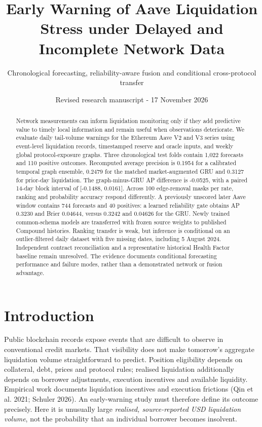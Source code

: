 \documentclass[
  10pt,
  a4paper,
]{article}
\title{Early Warning of Aave Liquidation Stress under Delayed and
Incomplete Network Data}
\subtitle{Chronological forecasting, reliability-aware fusion and
conditional cross-protocol transfer}
\author{}
\date{Revised research manuscript - 17 November 2026}
\begin{document}
\maketitle
\begin{abstract}
Network measurements can inform liquidation monitoring only if they add
predictive value to timely local information and remain useful when
observations deteriorate. We evaluate daily tail-volume warnings for the
Ethereum Aave V2 and V3 series using event-level liquidation records,
timestamped reserve and oracle inputs, and weekly global
protocol-exposure graphs. Three chronological test folds contain 1,022
forecasts and 110 positive outcomes. Recomputed average precision is
0.1954 for a calibrated temporal graph ensemble, 0.2479 for the matched
market-augmented GRU and 0.3127 for prior-day liquidation. The
graph-minus-GRU AP difference is -0.0525, with a paired 14-day block
interval of {[}-0.1488, 0.0161{]}. Across 100 edge-removal masks per
rate, ranking and probability accuracy respond differently. A previously
unscored later Aave window contains 744 forecasts and 40 positives: a
learned reliability gate obtains AP 0.3230 and Brier 0.04644, versus
0.3242 and 0.04626 for the GRU. Newly trained common-schema models are
transferred with frozen source weights to published Compound histories.
Ranking transfer is weak, but inference is conditional on an
outlier-filtered daily dataset with five missing dates, including 5
August 2024. Independent contract reconciliation and a representative
historical Health Factor baseline remain unresolved. The evidence
documents conditional forecasting performance and failure modes, rather
than a demonstrated network or fusion advantage.
\end{abstract}

\section{Introduction}\label{introduction}

Public blockchain records expose events that are difficult to observe in
conventional credit markets. That visibility does not make tomorrow's
aggregate liquidation volume straightforward to predict. Position
eligibility depends on collateral, debt, prices and protocol rules;
realised liquidation additionally depends on borrower adjustments,
execution incentives and available liquidity. Empirical work documents
liquidation incentives and execution frictions (Qin et al. 2021; Schuler
2026). An early-warning study must therefore define its outcome
precisely. Here it is unusually large \emph{realised, source-reported
USD liquidation volume}, not the probability that an individual borrower
becomes insolvent.
\end{document}
